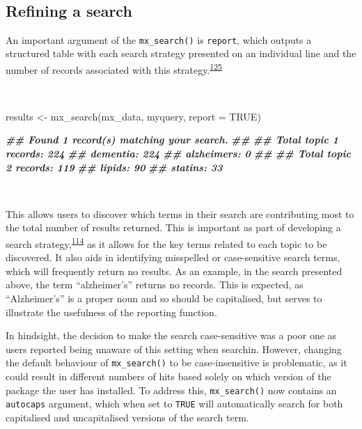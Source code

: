 \documentclass[a4paper, twoside]{templates/ociamthesis}
\newenvironment{Shaded}{\begin{snugshade}}{\end{snugshade}}
\newcommand{\AttributeTok}[1]{\textcolor[rgb]{0.77,0.63,0.00}{#1}}
\newcommand{\ConstantTok}[1]{\textcolor[rgb]{0.00,0.00,0.00}{#1}}
\newcommand{\DocumentationTok}[1]{\textcolor[rgb]{0.56,0.35,0.01}{\textbf{\textit{#1}}}}
\newcommand{\FunctionTok}[1]{\textcolor[rgb]{0.00,0.00,0.00}{#1}}
\newcommand{\NormalTok}[1]{#1}
\newcommand{\OtherTok}[1]{\textcolor[rgb]{0.56,0.35,0.01}{#1}}
\renewenvironment{Shaded}
{
  \vspace{4pt}%
  \begin{snugshade}%
}{%
  \end{snugshade}%
  \vspace{4pt}%
}
\begin{document}
~

\hypertarget{refining-a-search}{%
\subsection{Refining a search}\label{refining-a-search}}

An important argument of the \texttt{mx\_search()} is \texttt{report}, which outputs a structured table with each search strategy presented on an individual line and the number of records associated with this strategy.\textsuperscript{\protect\hyperlink{ref-rethlefsen2021prisma}{125}}

~

\begin{Shaded}
\begin{Highlighting}[]
\NormalTok{results  }\OtherTok{\textless{}{-}} \FunctionTok{mx\_search}\NormalTok{(mx\_data,}
\NormalTok{                      myquery,}
                      \AttributeTok{report =} \ConstantTok{TRUE}\NormalTok{)}
\end{Highlighting}
\end{Shaded}

\begin{Shaded}
\begin{Highlighting}[]
\DocumentationTok{\#\# Found 1 record(s) matching your search.}
\DocumentationTok{\#\# }
\DocumentationTok{\#\# Total topic 1 records: 224}
\DocumentationTok{\#\# dementia: 224}
\DocumentationTok{\#\# alzheimer\textquotesingle{}s: 0}
\DocumentationTok{\#\# }
\DocumentationTok{\#\# Total topic 2 records: 119}
\DocumentationTok{\#\# lipids: 90}
\DocumentationTok{\#\# statins: 33}
\end{Highlighting}
\end{Shaded}

~

This allows users to discover which terms in their search are contributing most to the total number of results returned. This is important as part of developing a search strategy,\textsuperscript{\protect\hyperlink{ref-bramer2018}{114}} as it allows for the key terms related to each topic to be discovered. It also aids in identifying misspelled or case-sensitive search terms, which will frequently return no results. As an example, in the search presented above, the term ``alzheimer's'' returns no records. This is expected, as ``Alzheimer's'' is a proper noun and so should be capitalised, but serves to illustrate the usefulness of the reporting function.

In hindsight, the decision to make the search case-sensitive was a poor one as users reported being unaware of this setting when searchin. However, changing the default behaviour of \texttt{mx\_search()} to be case-insensitive is problematic, as it could result in different numbers of hits based solely on which version of the package the user has installed. To address this, \texttt{mx\_search()} now contains an \texttt{autocaps} argument, which when set to \texttt{TRUE} will automatically search for both capitalised and uncapitalised versions of the search term.
\end{document}
